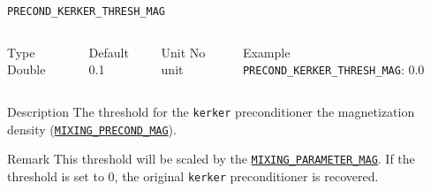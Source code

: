 \begin{frame}[allowframebreaks]{\texttt{PRECOND\_KERKER\_THRESH\_MAG}} \label{PRECOND_KERKER_THRESH_MAG}
\vspace*{-12pt}
\begin{columns}
\begin{block}{Type}
Double
\end{block}

\begin{block}{Default}
0.1
\end{block}

\begin{block}{Unit}
No unit
\end{block}

\begin{block}{Example}
\texttt{PRECOND\_KERKER\_THRESH\_MAG}: 0.0
\end{block}
\end{columns}

\begin{block}{Description}
The threshold for the \texttt{kerker} preconditioner the magnetization density (\hyperlink{MIXING_PRECOND_MAG}{\texttt{MIXING\_PRECOND\_MAG}}). 
\end{block}

\begin{block}{Remark}
This threshold will be scaled by the \hyperlink{MIXING_PARAMETER_MAG}{\texttt{MIXING\_PARAMETER\_MAG}}. If the threshold is set to 0, the original \texttt{kerker} preconditioner is recovered.
\end{block}

\end{frame}





